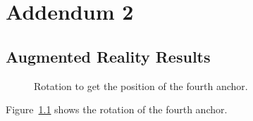 \chapter{Addendum 2}
\label{Addendum2}

\section{Augmented Reality Results}
\begin{figure}
	\centering
	
	\decoRule
	\caption{Rotation to get the position of the fourth anchor.}
	\label{fig:AR1}
\end{figure}

Figure~\ref{fig:AR1} shows the rotation of the fourth anchor.